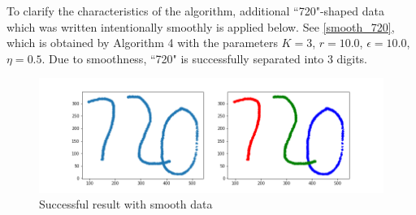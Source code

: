 \documentclass[twoside,11pt]{article}
\begin{document}
To clarify the characteristics of the algorithm, additional ``720"-shaped data which was written intentionally smoothly is applied below.
See \autoref{smooth_720}, which is obtained by Algorithm 4 with the parameters $K = 3$, $r = 10.0$, $\epsilon = 10.0$, $\eta = 0.5$.
Due to smoothness, ``720" is successfully separated into 3 digits.

\begin{figure}[htbp]
\centering
\vspace{-1em}
\includegraphics[width=0.9  \textwidth]{smooth_720_1.png}
\vspace{-1em}
\caption{Successful result with smooth data}
\label{smooth_720}
\end{figure}
\end{document}
